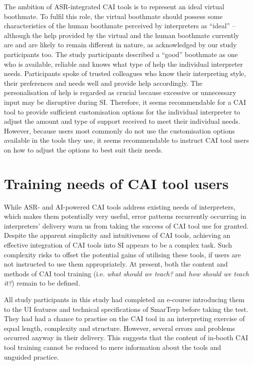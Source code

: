 The ambition of ASR-integrated CAI tools is to represent an ideal virtual boothmate. To fulfil this role, the virtual boothmate should possess some characteristics of the human boothmate perceived by interpreters as ``ideal'' -- although the help provided by the virtual and the human boothmate currently are and are likely to remain different in nature, as acknowledged by our study participants too. The study participants described a ``good'' boothmate as one who is available, reliable and knows what type of help the individual interpreter needs. Participants spoke of trusted colleagues who know their interpreting style, their preferences and needs well and provide help accordingly. The personalisation of help is regarded as crucial because excessive or unnecessary input may be disruptive during SI. Therefore, it seems recommendable for a CAI tool to provide sufficient customisation options for the individual interpreter to adjust the amount and type of support received to meet their individual needs. However, because users most commonly do not use the customisation options available in the tools they use, it seems recommendable to instruct CAI tool users on how to adjust the options to best suit their needs.













\section{Training needs of CAI tool users}


While ASR- and AI-powered CAI tools address existing needs of interpreters, which makes them potentially very useful, error patterns recurrently occurring in interpreters’ delivery warn us from taking the success of CAI tool use for granted. Despite the apparent simplicity and intuitiveness of CAI tools, achieving an effective integration of CAI tools into SI appears to be a complex task. Such complexity risks to offset the potential gains of utilising these tools, if users are not instructed to use them appropriately. At present, both the content and methods of CAI tool training (i.e. \textit{what should we teach?} and \textit{how should we teach it?}) remain to be defined.

All study participants in this study had completed an e-course introducing them to the UI features and technical specifications of SmarTerp before taking the test. They had had a chance to practise on the CAI tool in an interpreting exercise of equal length, complexity and structure. However, several errors and problems occurred anyway in their delivery. This suggests that the content of in-booth CAI tool training cannot be reduced to mere information about the tools and unguided practice.


